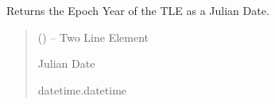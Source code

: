 \documentclass[letterpaper,10pt,english]{sphinxmanual}
\begin{document}
\begin{fulllineitems}
\label{\detokenize{fspsim.utils:fspsim.utils.Conversions.TLE_time}}
\pysigstartsignatures
{}
\pysigstopsignatures
\sphinxAtStartPar
Returns the Epoch Year of the TLE as a Julian Date.
\begin{quote}\begin{description}
\sphinxAtStartPar
{} () – Two Line Element

\sphinxAtStartPar
Julian Date

\sphinxAtStartPar
datetime.datetime

\end{description}\end{quote}

\end{fulllineitems}

\end{document}
